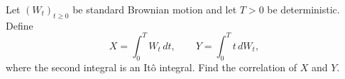 Let $(W_t)_{t\ge0}$ be standard Brownian motion and let $T>0$ be deterministic. Define
\[
 X=\int_0^T W_t\,dt,\qquad
 Y=\int_0^T t\,dW_t,
\]
where the second integral is an It\^o integral. Find the correlation of $X$ and $Y$.
